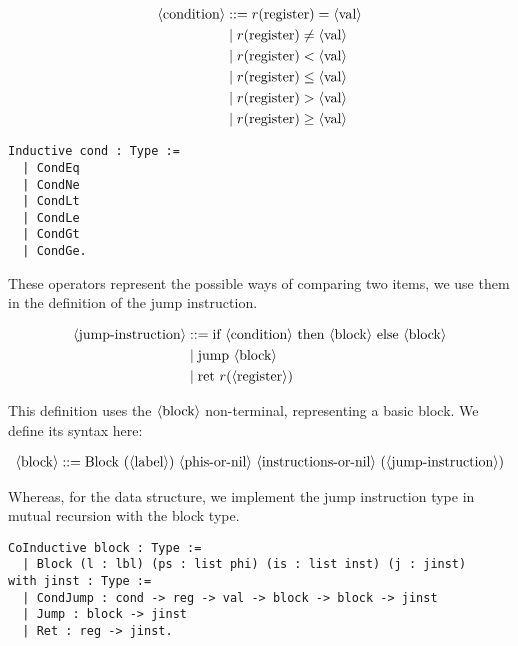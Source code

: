 \begin{minipage}{0.45\linewidth}
\begin{align*}
\langle\text{condition}\rangle &::= r(\text{register}) = \langle\text{val}\rangle \\
&\mid r(\text{register}) \neq \langle\text{val}\rangle \\
&\mid r(\text{register}) < \langle\text{val}\rangle \\
&\mid r(\text{register}) \leq \langle\text{val}\rangle \\
&\mid r(\text{register}) > \langle\text{val}\rangle \\
&\mid r(\text{register}) \geq \langle\text{val}\rangle \\
\end{align*}
\end{minipage}
\hfill
\begin{minipage}{0.45\linewidth}
\begin{lstlisting}[style=Rocq]
Inductive cond : Type :=
  | CondEq
  | CondNe
  | CondLt
  | CondLe
  | CondGt
  | CondGe.
\end{lstlisting}
\end{minipage}

These operators represent the possible ways of comparing two items, we use them in the definition of the jump instruction.

\begin{align*}
\langle\text{jump-instruction}\rangle &::= \text{if} \ \langle\text{condition}\rangle \ \text{then} \ \langle\text{block}\rangle \ \text{else} \ \langle\text{block}\rangle \\
&\mid \text{jump} \ \langle\text{block}\rangle \\
&\mid \text{ret} \ r( \langle\text{register}\rangle )
\end{align*}

This definition uses the $\langle\text{block}\rangle$ non-terminal, representing a basic block. We define its syntax here:

\begin{align*}
\nt{block} ::= \text{Block} \ ( \nt{label} ) \ \nt{phis-or-nil} \ \nt{instructions-or-nil} \ ( \nt{jump-instruction} )
\end{align*}

Whereas, for the data structure, we implement the jump instruction type in mutual recursion with the block type.

\begin{lstlisting}[style=Rocq]
CoInductive block : Type :=
  | Block (l : lbl) (ps : list phi) (is : list inst) (j : jinst)
with jinst : Type :=
  | CondJump : cond -> reg -> val -> block -> block -> jinst
  | Jump : block -> jinst
  | Ret : reg -> jinst.
\end{lstlisting}

